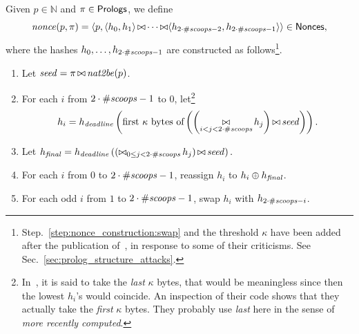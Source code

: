 \begin{alg}[$\nonce(p,\pi)$]\label{alg:nonce_construction}
  Given $p\in\mathbb{N}$ and $\pi\in{\mathsf{Prologs}}$, we define
  \[
  {\mathit{nonce}}(p,\pi)=\langle p,\langle h_0,h_1\rangle\operatorname*{\bowtie}
  \cdots\operatorname*{\bowtie}\langle h_{2\cdot{\#\mathit{scoops}}-2},h_{2\cdot{\#\mathit{scoops}}-1}\rangle\rangle\in{\mathsf{Nonces}},
  \]
  where the hashes $h_0,\ldots,h_{2\cdot{\#\mathit{scoops}}-1}$ are constructed as
  follows\footnote{Step.~\ref{step:nonce_construction:swap} and the threshold $\kappa$
  have been added after the publication of~\cite{ParkKFGAP18},
  in response to some of their criticisms.
  See Sec.~\ref{sec:prolog_structure_attacks}.}.
  \begin{enumerate}
  \item\label{step:nonce_construction:seed} Let ${\mathit{seed}}=\pi\operatorname*{\bowtie}{\mathit{nat2be}}(p)$.
  \item\label{step:nonce_construction:first_hash}
    For each $i$ from $2\cdot{\#\mathit{scoops}}-1$ to $0$,
    let\footnote{In~\cite{SignumPlotting}, it is said to
    take the \emph{last} $\kappa$ bytes, that would be meaningless since then
    the lowest $h_i$'s would coincide. An inspection of their code
    shows that they actually take the \emph{first} $\kappa$ bytes. They
    probably use \emph{last} here in the sense of \emph{more recently computed}.}
    \[
    h_i=h_{\mathit{deadline}}\left(\text{first $\kappa$ bytes of}\left(\left(\operatorname*{\bowtie}_{i<j<2\cdot{\#\mathit{scoops}}}h_j\right)\operatorname*{\bowtie}{\mathit{seed}}\right)\right).
    \]
  \item\label{step:nonce_construction:final_hash}
    Let
    $
    {h_{\mathit{final}}}=h_{\mathit{deadline}}\left(\left(\operatorname*{\bowtie}_{0\le j<2\cdot{\#\mathit{scoops}}}h_j\right)\operatorname*{\bowtie}{\mathit{seed}}\right).
    $
  \item\label{step:nonce_construction:modify} For each $i$ from $0$ to $2\cdot{\#\mathit{scoops}}-1$, reassign
    $h_i$ to $h_i\oplus{h_{\mathit{final}}}$.
  \item\label{step:nonce_construction:swap}
    For each odd $i$ from $1$ to $2\cdot{\#\mathit{scoops}}-1$, swap
    $h_i$ with $h_{2\cdot{\#\mathit{scoops}}-i}$.
  \end{enumerate}
\end{alg}
%
%
